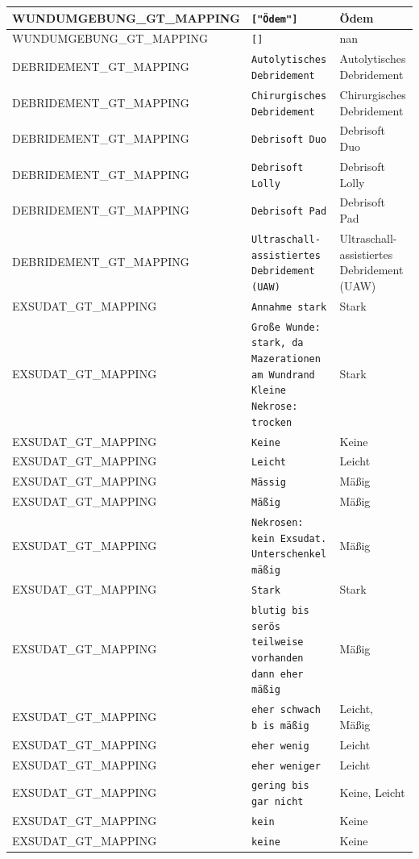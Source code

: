 \begin{longtable}{|p{3.5cm}|p{5cm}|p{6.5cm}|}
WUNDUMGEBUNG\_GT\_MAPPING & \texttt{["Ödem"]} & Ödem \\ \hline
WUNDUMGEBUNG\_GT\_MAPPING & \texttt{[]} & nan \\ \hline
DEBRIDEMENT\_GT\_MAPPING & \texttt{Autolytisches Debridement} & Autolytisches Debridement \\ \hline
DEBRIDEMENT\_GT\_MAPPING & \texttt{Chirurgisches Debridement} & Chirurgisches Debridement \\ \hline
DEBRIDEMENT\_GT\_MAPPING & \texttt{Debrisoft Duo} & Debrisoft Duo \\ \hline
DEBRIDEMENT\_GT\_MAPPING & \texttt{Debrisoft Lolly} & Debrisoft Lolly \\ \hline
DEBRIDEMENT\_GT\_MAPPING & \texttt{Debrisoft Pad} & Debrisoft Pad \\ \hline
DEBRIDEMENT\_GT\_MAPPING & \texttt{Ultraschall-assistiertes Debridement (UAW)} & Ultraschall-assistiertes Debridement (UAW) \\ \hline
EXSUDAT\_GT\_MAPPING & \texttt{Annahme stark} & Stark \\ \hline
EXSUDAT\_GT\_MAPPING & \texttt{Große Wunde: stark, da Mazerationen am Wundrand
Kleine Nekrose: trocken} & Stark \\ \hline
EXSUDAT\_GT\_MAPPING & \texttt{Keine} & Keine \\ \hline
EXSUDAT\_GT\_MAPPING & \texttt{Leicht} & Leicht \\ \hline
EXSUDAT\_GT\_MAPPING & \texttt{Mässig} & Mäßig \\ \hline
EXSUDAT\_GT\_MAPPING & \texttt{Mäßig} & Mäßig \\ \hline
EXSUDAT\_GT\_MAPPING & \texttt{Nekrosen: kein Exsudat. Unterschenkel mäßig} & Mäßig \\ \hline
EXSUDAT\_GT\_MAPPING & \texttt{Stark} & Stark \\ \hline
EXSUDAT\_GT\_MAPPING & \texttt{blutig bis serös teilweise vorhanden dann eher mäßig} & Mäßig \\ \hline
EXSUDAT\_GT\_MAPPING & \texttt{eher schwach b is mäßig} & Leicht, Mäßig \\ \hline
EXSUDAT\_GT\_MAPPING & \texttt{eher wenig} & Leicht \\ \hline
EXSUDAT\_GT\_MAPPING & \texttt{eher weniger} & Leicht \\ \hline
EXSUDAT\_GT\_MAPPING & \texttt{gering bis gar nicht} & Keine, Leicht \\ \hline
EXSUDAT\_GT\_MAPPING & \texttt{kein} & Keine \\ \hline
EXSUDAT\_GT\_MAPPING & \texttt{keine} & Keine \\ \hline

\end{longtable}
